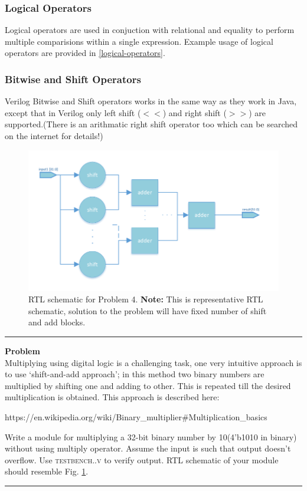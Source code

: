 \documentclass[a4paper,10pt]{article}
\newcommand{\ano}{\text{1}}
\theoremstyle{mytheor}
\newcommand{
  \insertverilog}[3]{
  
}
\newcounter{problemNumber}
\newcommand {
  \insertProblem}[1]{
  \vspace{0.5cm}
  \hrule
  \vspace{0.3cm}

  {\color{greatblue}\textbf{\large{Problem \theproblemNumber}}}
  \vspace{2pt}\\#1

  \addtocounter{problemNumber}{1}
  \vspace{0.2cm}
  \hrule  
  \vspace{0.5cm}
}
\begin{document}
\subsubsection*{Logical Operators}
Logical operators are used in conjuction with relational and equality
to perform multiple comparisions within a single expression.
Example usage of logical operators are provided in \ref{logical-operators}.
\insertverilog{./verilog_files/logicalOperators.v}{logical-operators}{\text{Functioning of logical operator}}

\subsubsection*{Bitwise and Shift Operators}
Verilog Bitwise and Shift operators works in the same way as they work
in Java, except that in Verilog only left shift (\textbf{$<<$}) and right shift
(\textbf{$>>$}) are supported.(There is an arithmatic right shift operator too which can be searched on the internet for details!)

\begin{figure}[!h] \centering  
  \includegraphics[width=0.9\linewidth]{./resources/shift_and_add_representation.pdf}
  \caption{RTL schematic for Problem 4. \textbf{Note:} This is representative RTL schematic, solution to the problem will have fixed number of shift and add blocks.} 
  \label{Fig:problem-4-RTL} 
\end{figure}    

\insertProblem {
  Multiplying using digital logic is a challenging task, one very intuitive approach is to use `shift-and-add approach'; in this method two binary numbers are multiplied by shifting one and adding to other. This is repeated till the desired multiplication is obtained. This approach is described here: \begin{center}https://en.wikipedia.org/wiki/Binary\_multiplier\#Multiplication\_basics\end{center} 
  
    Write a module for multiplying a 32-bit binary number by 10(4'b1010 in binary) without using multiply operator. Assume the input is such that output doesn't overflow. Use \textsc{testbench{\ano}.{\theproblemNumber}.v} to verify output. RTL schematic of your module should resemble Fig. \ref{Fig:problem-4-RTL}.
}
\end{document}
